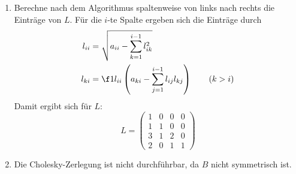 \documentclass{mywork}
\begin{document}
	\begin{aufgabe}
		\begin{enumerate}[A:]
			\item
				Berechne nach dem Algorithmus spaltenweise von links nach rechts die Einträge von $L$.
				Für die $i$-te Spalte ergeben sich die Einträge durch
				\begin{align*}
					l_{ii} &= \sqrt{a_{ii} - \sum_{k=1}^{i-1}l_{ik}^2}\\
					l_{ki} &= \f 1{l_{ii}} \left( a_{ki} - \sum_{j=1}^{i-1}l_{ij}l_{kj}\right) \qquad (k>i)
				\end{align*}
				Damit ergibt sich für $L$:
				\[
					L = \begin{pmatrix}1&0&0&0\\1&1&0&0\\3&1&2&0\\2&0&1&1\end{pmatrix}
				\]
			\item
				Die Cholesky-Zerlegung ist nicht durchführbar, da $B$ nicht symmetrisch ist.
		\end{enumerate}
	\end{aufgabe}
\end{document}
